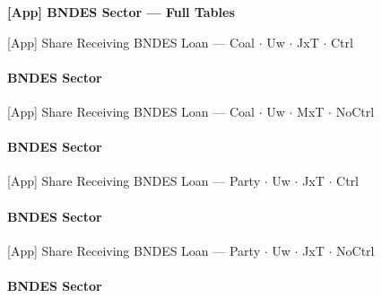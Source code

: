 \documentclass[aspectratio=169,10pt]{beamer}
\newcommand{\tbndes}{../tables/agg_firm_bndes_sector}
\begin{document}

\begin{frame}[plain]
\begin{center}
{\Large\textbf{[App] BNDES Sector --- Full Tables}}
\end{center}
\end{frame}

\begin{frame}[t,shrink=5]{[App] Share Receiving BNDES Loan --- Coal $\cdot$ Uw $\cdot$ JxT $\cdot$ Ctrl}
\framesubtitle{BNDES Sector}
\begin{center}\footnotesize

\end{center}
\end{frame}

\begin{frame}[t,shrink=5]{[App] Share Receiving BNDES Loan --- Coal $\cdot$ Uw $\cdot$ MxT $\cdot$ NoCtrl}
\framesubtitle{BNDES Sector}
\begin{center}\footnotesize

\end{center}
\end{frame}

\begin{frame}[t,shrink=5]{[App] Share Receiving BNDES Loan --- Party $\cdot$ Uw $\cdot$ JxT $\cdot$ Ctrl}
\framesubtitle{BNDES Sector}
\begin{center}\footnotesize

\end{center}
\end{frame}

\begin{frame}[t,shrink=5]{[App] Share Receiving BNDES Loan --- Party $\cdot$ Uw $\cdot$ JxT $\cdot$ NoCtrl}
\framesubtitle{BNDES Sector}
\begin{center}\footnotesize

\end{center}
\end{frame}
\end{document}
